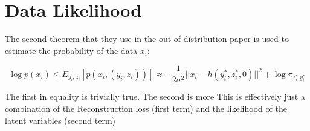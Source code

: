 \documentclass{report}
\begin{document}
	\section{Data Likelihood}
	The second theorem that they use in the out of distribution paper is used to estimate the probability of the data $x_i$:
	
	\begin{equation}
	\log p (x_i) \leq E_{y_i, z_i}\left[p\left(x_i, (y_i, z_i)\right)\right] \approx -\frac{1}{2\sigma^2}||x_i - h(y_i^*, z_i^*, 0)||^2 + \log \pi_{z_i^*|y_i^*}
	\end{equation}
	
	The first in equality is trivially true. The second is more This is effectively just a combination of the Reconstruction loss (first term) and the likelihood of the latent variables (second term)
	
\end{document}
